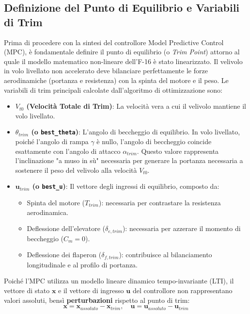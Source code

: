 \subsection{Definizione del Punto di Equilibrio e Variabili di Trim}
Prima di procedere con la sintesi del controllore Model Predictive Control (MPC), \`e fondamentale definire il punto di equilibrio (o \textit{Trim Point}) attorno al quale il modello matematico non-lineare dell'F-16 \`e stato linearizzato. Il velivolo in volo livellato non accelerato deve bilanciare perfettamente le forze aerodinamiche (portanza e resistenza) con la spinta del motore e il peso.
Le variabili di trim principali calcolate dall'algoritmo di ottimizzazione sono:
\begin{itemize}
	\item \textbf{$V_{t0}$ (Velocit\`a Totale di Trim)}: La velocit\`a vera a cui il velivolo mantiene il volo livellato.
	\item \textbf{$\theta_{trim}$ (o \texttt{best\_theta})}: L'angolo di beccheggio di equilibrio. In volo livellato, poich\'e l'angolo di rampa $\gamma$ \`e nullo, l'angolo di beccheggio coincide esattamente con l'angolo di attacco $\alpha_{trim}$. Questo valore rappresenta l'inclinazione "a muso in s\`u" necessaria per generare la portanza necessaria a sostenere il peso del velivolo alla velocit\`a $V_{t0}$.
	\item \textbf{$\mathbf{u}_{trim}$ (o \texttt{best\_u})}: Il vettore degli ingressi di equilibrio, composto da:
	\begin{itemize}
		\item Spinta del motore ($T_{trim}$): necessaria per contrastare la resistenza aerodinamica.
		\item Deflessione dell'elevatore ($\delta_{e, trim}$): necessaria per azzerare il momento di beccheggio ($C_m = 0$).
		\item Deflessione dei flaperon ($\delta_{f, trim}$): contribuisce al bilanciamento longitudinale e al profilo di portanza.
	\end{itemize}
\end{itemize}
Poich\'e l'MPC utilizza un modello lineare dinamico tempo-invariante (LTI), il vettore di stato $\mathbf{x}$ e il vettore di ingresso $\mathbf{u}$ del controllore non rappresentano valori assoluti, bens\`i \textbf{perturbazioni} rispetto al punto di trim:
\begin{equation}
	\mathbf{x} = \mathbf{x}_{assoluto} - \mathbf{x}_{trim}, \quad \mathbf{u} = \mathbf{u}_{assoluto} - \mathbf{u}_{trim}
\end{equation}
